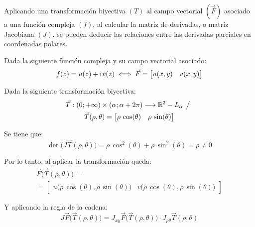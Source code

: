 \documentclass[a5paper,12pt,twoside]{book}
\begin{document}
Aplicando una transformación biyectiva $(T)$ al campo vectorial $(\Vec{F})$ asociado a una función compleja $(f)$, al calcular la matriz de derivadas, o matriz Jacobiana $(J)$, se pueden deducir las relaciones entre las derivadas parciales en coordenadas polares.

Dada la siguiente función compleja y su campo vectorial asociado:
\begin{equation*}
    f(z) = u(z) + \mathrm{i}\mkern1mu v(z) \iff \Vec{F} = \begin{bmatrix} u(x,y) & v(x,y) \end{bmatrix}
\end{equation*}

Dada la siguiente transformación biyectiva:
\begin{multline*}
    \Vec{T}: (0;+\infty) \times (\alpha;\alpha+2\pi) \longrightarrow \mathbb{R}^2 - L_\alpha \hspace{1ex} \big/ \hspace{1ex}
    \\
    \Vec{T}(\rho,\theta) = \begin{bmatrix} \rho \, \cos(\theta) & \rho \, \sin(\theta) \end{bmatrix}
\end{multline*}

Se tiene que:
\begin{equation*}
    \operatorname{det} \big( J \Vec{T}(\rho,\theta) \big) = \rho \, \cos^2(\theta) + \rho \, \sin^2(\theta) = \rho \neq 0
\end{equation*}

Por lo tanto, al aplicar la transformación queda:
\begin{multline*}
    \Vec{F} \Big( \Vec{T}(\rho,\theta) \Big) =
    \\
    = \begin{bmatrix} u \Big( \rho \, \cos{(\theta)} , \rho \, \sin(\theta) \Big) & v \Big( \rho \, \cos(\theta) , \rho \, \sin(\theta) \Big) \end{bmatrix}
\end{multline*}

Y aplicando la regla de la cadena:
\begin{equation*}
    J \Vec{F} \Big( \Vec{T}(\rho,\theta) \Big) = J_{xy} \Vec{F} \Big( \Vec{T}(\rho,\theta) \Big) \cdot J_{\rho\theta} \Vec{T}(\rho,\theta)
\end{equation*}
\end{document}
